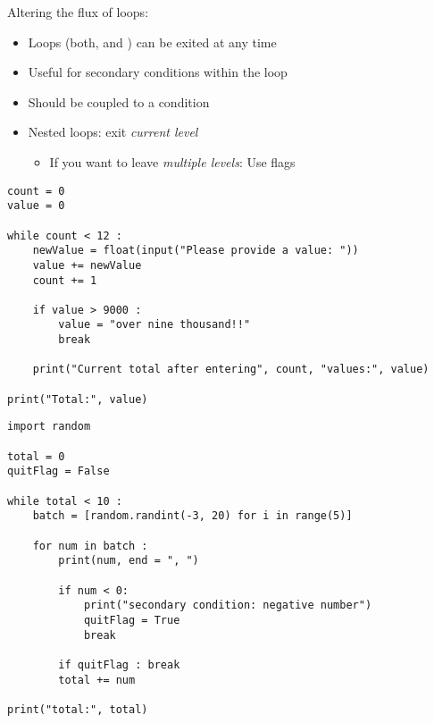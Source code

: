 \begin{frame}[fragile]{Altering the flux of loops: }
%
\begin{itemize}
\item Loops (\ie both,  and ) can be exited at any time
\item Useful for secondary conditions within the loop
\item Should be coupled to a condition\\
 \Thus {}
\item Nested loops: exit \emph{current level}
	\begin{itemize}
	\item If you want to leave \emph{multiple levels}: Use flags
	\end{itemize}
\end{itemize}
%
\end{frame}


\begin{frame}[fragile]
\begin{codebox}
\begin{verbatim}
count = 0
value = 0

while count < 12 :
    newValue = float(input("Please provide a value: "))
    value += newValue
    count += 1
  
    if value > 9000 :
        value = "over nine thousand!!"
        break
  
    print("Current total after entering", count, "values:", value)

print("Total:", value)
\end{verbatim}
\end{codebox}
\end{frame}


\begin{frame}[fragile]
\begin{codebox}
\begin{verbatim}
import random

total = 0
quitFlag = False

while total < 10 :
    batch = [random.randint(-3, 20) for i in range(5)]
    
    for num in batch :
        print(num, end = ", ")

        if num < 0:
            print("secondary condition: negative number")
            quitFlag = True
            break
            
        if quitFlag : break
        total += num
    
print("total:", total)
\end{verbatim}
\end{codebox}
\end{frame}

